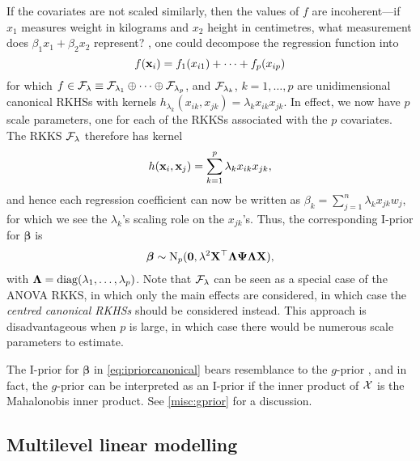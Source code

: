 If the covariates are not scaled similarly, then the values of $f$ are incoherent---if $x_1$  measures weight in kilograms and $x_2$ height in centimetres, what measurement does $\beta_1x_1 + \beta_2x_2$ represent?
, one could decompose the regression function into
\[
  f({\mathbf x}_i) = f_1(x_{i1}) + \cdots + f_p(x_{ip}) 
\]
for which $f \in {\mathcal F}_\lambda \equiv {\mathcal F}_{\lambda_1}\oplus\cdots\oplus{\mathcal F}_{\lambda_p}$, and ${\mathcal F}_{\lambda_k}$, $k=1,\dots,p$ are unidimensional canonical RKHSs with kernels $h_{\lambda_k}(x_{ik},x_{jk}) = \lambda_k x_{ik} x_{jk}$.
In effect, we now have $p$ scale parameters, one for each of the RKKSs associated with the $p$ covariates.
The RKKS ${\mathcal F}_\lambda$ therefore has kernel
\[
  h({\mathbf x}_i,{\mathbf x}_j) = \sum_{k=1}^p \lambda_k  x_{ik} x_{jk},
\]
and hence each regression coefficient can now be written as $\beta_k =  \sum_{j=1}^n  \lambda_k x_{jk}w_j$, for which we see the $\lambda_k$'s scaling role on the $x_{jk}$'s.
Thus, the corresponding I-prior for $\boldsymbol{\beta}$ is
\[
  \boldsymbol{\beta} \sim \operatorname{N}_p({\mathbf 0}, \lambda^2 {\mathbf X}^\top{\bm\Lambda} {\bm\Psi} {\bm\Lambda} {\mathbf X}),
\]
with ${\bm\Lambda} = \operatorname{diag}(\lambda_1,\dots,\lambda_p)$.
Note that ${\mathcal F}_\lambda$ can be seen as a special case of the ANOVA RKKS, in which only the main effects are considered, in which case the \emph{centred canonical RKHSs} should be considered instead.
This approach is disadvantageous when $p$ is large, in which case there would be numerous scale parameters to estimate.

\begin{remark}
  The I-prior for $\boldsymbol{\beta}$ in \cref{eq:ipriorcanonical} bears resemblance to the $g$-prior \citep{zellner1986assessing}, and in fact, the $g$-prior can be interpreted as an I-prior if the inner product of ${\mathcal X}$ is the Mahalonobis inner product.
  See \cref{misc:gprior} for a discussion.
\end{remark}

\subsection{Multilevel linear modelling}
\label{sec:multilevelmodels}

